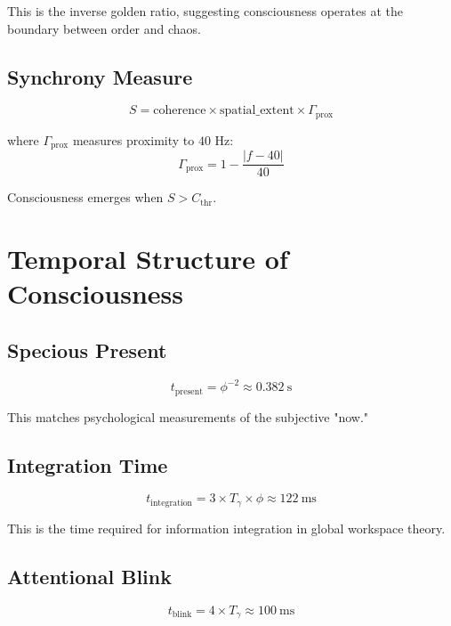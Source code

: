 \documentclass[12pt,a4paper]{article}
\begin{document}
This is the inverse golden ratio, suggesting consciousness operates at the boundary between order and chaos.

\subsection{Synchrony Measure}

\begin{equation}
S = \text{coherence} \times \text{spatial\_extent} \times \Gamma_{\text{prox}}
\end{equation}

where $\Gamma_{\text{prox}}$ measures proximity to $40$ Hz:
\begin{equation}
\Gamma_{\text{prox}} = 1 - \frac{|f - 40|}{40}
\end{equation}

Consciousness emerges when $S > C_{\text{thr}}$.

\section{Temporal Structure of Consciousness}

\subsection{Specious Present}

\begin{equation}
t_{\text{present}} = \phi^{-2} \approx 0.382~\text{s}
\end{equation}

This matches psychological measurements of the subjective "now."

\subsection{Integration Time}

\begin{equation}
t_{\text{integration}} = 3 \times T_\gamma \times \phi \approx 122~\text{ms}
\end{equation}

This is the time required for information integration in global workspace theory.

\subsection{Attentional Blink}

\begin{equation}
t_{\text{blink}} = 4 \times T_\gamma \approx 100~\text{ms}
\end{equation}
\end{document}
